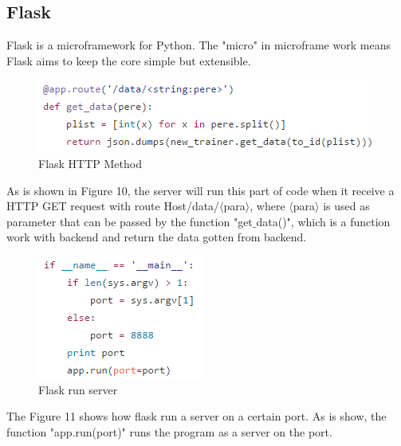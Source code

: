 \subsection{Flask}

Flask is a microframework for Python. The "micro" in microframe work means Flask aims to keep the core simple but extensible.

\begin{figure}[h]
\centering
		\includegraphics[width=\linewidth]{figure/FlaskHttp}
	\caption{Flask HTTP Method}
	\label{fig:flshttp}
\end{figure}
As is shown in Figure 10, the server will run this part of code when it receive a HTTP GET request with route Host/data/$\langle$para$\rangle$, where $\langle$para$\rangle$ is used as parameter that can be passed by the function "get$\_$data()", which is a function work with backend and return the data gotten from backend.

\begin{figure}[h]
\centering
		\includegraphics[width=\linewidth]{figure/FlaskRun}
	\caption{Flask run server}
	\label{fig:flsrun}
\end{figure}

The Figure 11 shows how flask run a server on a certain port. As is show, the function "app.run(port)" runs the program as a server on the port.